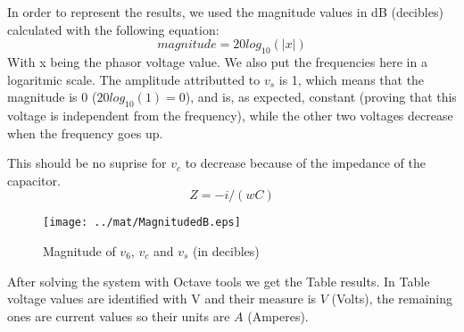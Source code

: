 In order to represent the results, we used the magnitude values in dB (decibles) calculated with the following equation:
\begin{equation}
magnitude = 20log_{10}(|x|)
\label{eq:1.21}
\end{equation}
With x being the phasor voltage value. 
We also put the frequencies here in a logaritmic scale. The amplitude attributted to $v_s$ is 1, which means that the magnitude is 0 ($20log_{10}(1)=0$), and is, as expected, constant (proving that this voltage is independent from the frequency), while the other two voltages decrease when the frequency goes up. 

This should be no suprise for $v_c$ to decrease because of the impedance of the capacitor.
\begin{equation}
Z = -i/(wC)
\label{eq:1.22}
\end{equation}

\begin{figure}[H] \centering
\texttt{[image: ../mat/MagnitudedB.eps]}
\caption{Magnitude of $v_6$, $v_c$ and $v_s$ (in decibles)}
\label{fig:mat5ps}
\end{figure}



After solving the system with Octave tools we get the Table results. In Table voltage values are identified with V and their measure is $V$ (Volts), the remaining ones are current values so their units are $A$ (Amperes).





